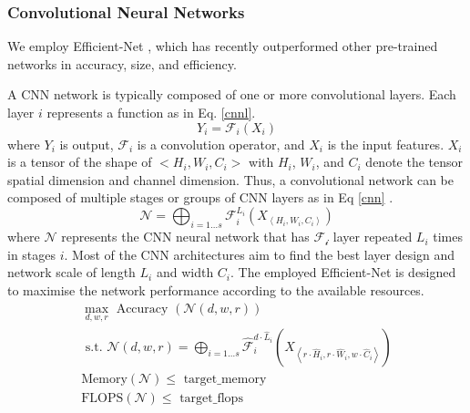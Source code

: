 \documentclass[conference]{IEEEtran}
\begin{document}
\subsubsection{Convolutional Neural Networks}
We employ Efficient-Net \cite{tan2019efficientnet}, which has recently outperformed other pre-trained networks in accuracy, size, and efficiency. 

A CNN network is typically composed of one or more convolutional layers. Each layer $i$ represents a function as in Eq. \ref{cnnl}.
\begin{equation}\label{cnnl}
    Y_i = \mathcal{F}_i(X_i)
\end{equation}
where $Y_i$ is output, $\mathcal{F}_i$ is a convolution operator, and $X_i$ is the input features. $X_i$ is a tensor of the shape of $<H_i, W_i, C_i>$ with $H_i$, $W_i$, and $C_i$ denote the tensor spatial dimension and channel dimension. Thus, a convolutional network can be composed of multiple stages or groups of CNN layers as in Eq \ref{cnn} \cite{he2016deep}.
\begin{equation}\label{cnn}
    \mathcal{N} = \bigoplus_{i=1 \ldots s} \mathcal{F}_{i}^{L_{i}}\left(X_{\left\langle H_{i}, W_{i}, C_{i}\right\rangle}\right)
\end{equation}
where $\mathcal{N}$ represents the CNN neural network that has $\mathcal{F_i}$ layer repeated $L_{i}$ times in stages $i$. Most of the CNN architectures aim to find the best layer design and network scale of length $L_i$ and width $C_i$. The employed Efficient-Net is designed to maximise the network performance according to the available resources. 
\begin{equation}
    \begin{array}{ll}
    \max _{d, w, r} \text { Accuracy }(\mathcal{N}(d, w, r)) \\
    \text { s.t. }  \mathcal{N}(d, w, r) = \bigoplus_{i=1 \ldots s} \hat{\mathcal{F}}_{i}^{d \cdot \hat{L}_{i}}\left(X_{\left\langle r \cdot \hat{H}_{i}, r \cdot \hat{W}_{i}, w \cdot \hat{C}_{i}\right\rangle}\right) \\
    \text{Memory}(\mathcal{N}) \leq \text { target\_memory } \\
    \text{FLOPS}(\mathcal{N}) \leq \text { target\_flops }
    \end{array}
\end{equation}
\end{document}
